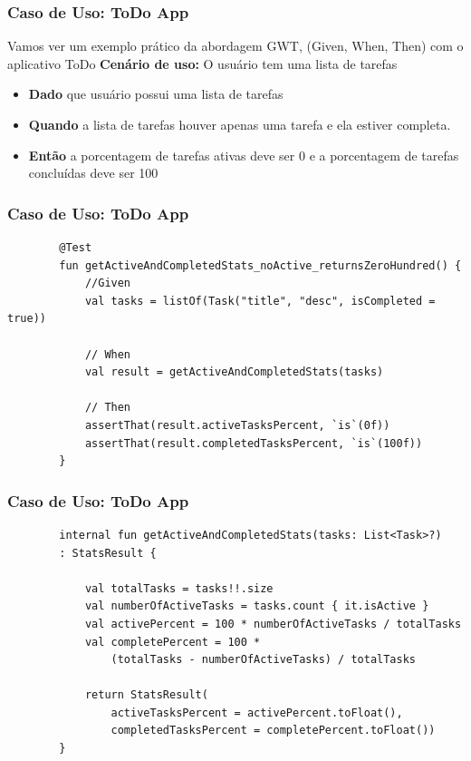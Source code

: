\documentclass{beamer}
\begin{document}
\begin{frame}
\frametitle{Caso de Uso: ToDo App}
Vamos ver um exemplo prático da abordagem GWT, (Given, When, Then) com o aplicativo ToDo
\newline \textbf{Cenário de uso:} O usuário tem uma lista de tarefas
\begin{itemize}
\item \textbf{Dado} que usuário possui uma lista de tarefas
\item \textbf{Quando} a lista de tarefas houver apenas uma tarefa e ela estiver completa.
\item \textbf{Então} a porcentagem de tarefas ativas deve ser 0 e a porcentagem de tarefas concluídas deve ser 100
\end{itemize}
\end{frame}

\begin{frame}[fragile]
	\frametitle{Caso de Uso: ToDo App}
	\begin{example}
		\begin{lstlisting}
		@Test
		fun getActiveAndCompletedStats_noActive_returnsZeroHundred() {
			//Given
			val tasks = listOf(Task("title", "desc", isCompleted = true))
			
			// When 
			val result = getActiveAndCompletedStats(tasks)
		
			// Then 
			assertThat(result.activeTasksPercent, `is`(0f))
			assertThat(result.completedTasksPercent, `is`(100f))
		}
		\end{lstlisting}
	\end{example}
\end{frame}

\begin{frame}[fragile]
	\frametitle{Caso de Uso: ToDo App}
	\begin{example}
		\begin{lstlisting}
		internal fun getActiveAndCompletedStats(tasks: List<Task>?)
		: StatsResult {
		
			val totalTasks = tasks!!.size
			val numberOfActiveTasks = tasks.count { it.isActive }
			val activePercent = 100 * numberOfActiveTasks / totalTasks
			val completePercent = 100 * 
				(totalTasks - numberOfActiveTasks) / totalTasks
		
			return StatsResult(
				activeTasksPercent = activePercent.toFloat(),
				completedTasksPercent = completePercent.toFloat())
		}
		\end{lstlisting}
	\end{example}
\end{frame}
\end{document}
